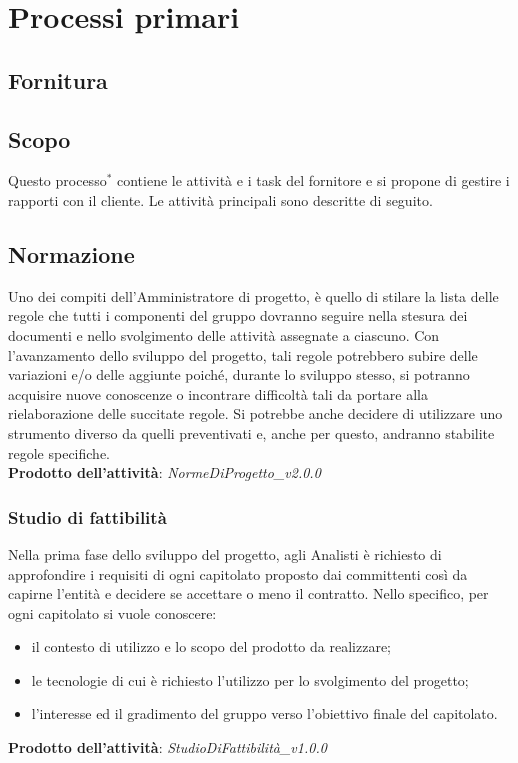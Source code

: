 \documentclass[11pt,a4paper]{article}
\begin{document}
{	\section{Processi primari}
	\subsection{Fornitura}
	\subsection{Scopo}
	Questo processo$^*$ contiene le attività e i task del fornitore e si propone di gestire i rapporti con il cliente. Le attività principali sono descritte di seguito.
	
	\iftrue
	\subsection{Normazione}
	Uno dei compiti dell'Amministratore di progetto, è quello di stilare la lista delle regole che tutti i componenti del gruppo dovranno seguire nella stesura dei documenti e nello svolgimento delle attività assegnate a ciascuno. Con l'avanzamento dello sviluppo del progetto, tali regole potrebbero subire delle variazioni e/o delle aggiunte poiché, durante lo sviluppo stesso, si potranno acquisire nuove conoscenze o incontrare difficoltà tali da portare alla rielaborazione delle succitate regole. Si potrebbe anche decidere di utilizzare uno strumento diverso da quelli preventivati e, anche per questo, andranno stabilite regole specifiche.\\
	\textbf{Prodotto dell'attività}: \textit{NormeDiProgetto\_v2.0.0}
	\fi
	
	\subsubsection{Studio di fattibilità}
	Nella prima fase dello sviluppo del progetto, agli Analisti è richiesto di approfondire i requisiti di ogni capitolato proposto dai committenti così da capirne l'entità e decidere se accettare o meno il contratto. Nello specifico, per ogni capitolato si vuole conoscere:
	\begin{itemize}
		\item il contesto di utilizzo e lo scopo del prodotto da realizzare;
		\item le tecnologie di cui è richiesto l'utilizzo per lo svolgimento del progetto;
		\item l'interesse ed il gradimento del gruppo verso l'obiettivo finale del capitolato.
	\end{itemize}
	\textbf{Prodotto dell'attività}: \textit{StudioDiFattibilità\_v1.0.0}
	
}
\end{document}
